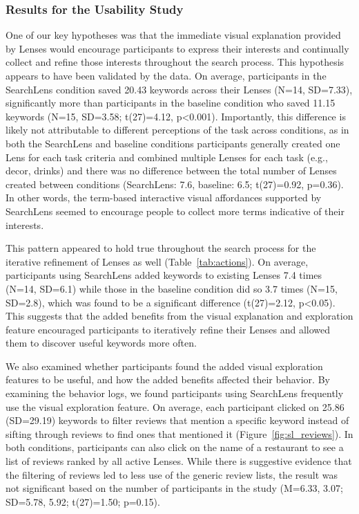 



\subsubsection{Results for the Usability Study}

One of our key hypotheses was that the immediate visual explanation provided by Lenses would encourage participants to express their interests and continually collect and refine those interests throughout the search process. This hypothesis appears to have been validated by the data. On average, participants in the SearchLens condition saved 20.43 keywords across their Lenses (N=14, SD=7.33), significantly more than participants in the baseline condition who saved 11.15 keywords (N=15, SD=3.58; t(27)=4.12, p<0.001). Importantly, this difference is likely not attributable to different perceptions of the task across conditions, as in both the SearchLens and baseline conditions participants generally created one Lens for each task criteria and combined multiple Lenses for each task (e.g., decor, drinks) and there was no difference between the total number of Lenses created between conditions (SearchLens: 7.6, baseline: 6.5; t(27)=0.92, p=0.36). In other words, the term-based interactive visual affordances supported by SearchLens seemed to encourage people to collect more terms indicative of their interests.

This pattern appeared to hold true throughout the search process for the iterative refinement of Lenses as well (Table~\ref{tab:actions}). On average, participants using SearchLens added keywords to existing Lenses 7.4 times (N=14, SD=6.1) while those in the baseline condition did so 3.7 times (N=15, SD=2.8), which was found to be a significant difference (t(27)=2.12, p<0.05). This suggests that the added benefits from the visual explanation and exploration feature encouraged participants to iteratively refine their Lenses and allowed them to discover useful keywords more often.

We also examined whether participants found the added visual exploration features to be useful, and how the added benefits affected their behavior. By examining the behavior logs, we found participants using SearchLens frequently use the visual exploration feature. On average, each participant clicked on 25.86 (SD=29.19) keywords to filter reviews that mention a specific keyword instead of sifting through reviews to find ones that mentioned it (Figure~\ref{fig:sl_reviews}). In both conditions, participants can also click on the name of a restaurant to see a list of reviews ranked by all active Lenses. While there is suggestive evidence that the filtering of reviews led to less use of the generic review lists, the result was not significant based on the number of participants in the study (M=6.33, 3.07; SD=5.78, 5.92; t(27)=1.50; p=0.15).


